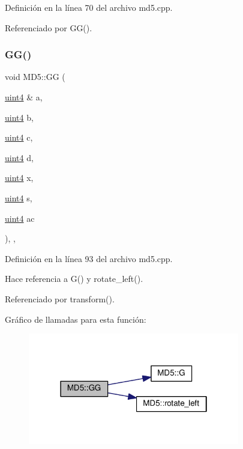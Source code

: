 Definición en la línea 70 del archivo md5.\+cpp.



Referenciado por G\+G().

\hypertarget{classMD5_a8ebdbe52608e522516d1759a31753212}{}\label{classMD5_a8ebdbe52608e522516d1759a31753212} 
\subsubsection{\texorpdfstring{G\+G()}{GG()}}
{\footnotesize\ttfamily void M\+D5\+::\+GG (\begin{DoxyParamCaption}\item[{\hyperlink{classMD5_a2e5b84a3d7db292f49873061214a0444}{uint4} \&}]{a,  }\item[{\hyperlink{classMD5_a2e5b84a3d7db292f49873061214a0444}{uint4}}]{b,  }\item[{\hyperlink{classMD5_a2e5b84a3d7db292f49873061214a0444}{uint4}}]{c,  }\item[{\hyperlink{classMD5_a2e5b84a3d7db292f49873061214a0444}{uint4}}]{d,  }\item[{\hyperlink{classMD5_a2e5b84a3d7db292f49873061214a0444}{uint4}}]{x,  }\item[{\hyperlink{classMD5_a2e5b84a3d7db292f49873061214a0444}{uint4}}]{s,  }\item[{\hyperlink{classMD5_a2e5b84a3d7db292f49873061214a0444}{uint4}}]{ac }\end{DoxyParamCaption})\hspace{0.3cm}{\ttfamily [inline]}, {\ttfamily [static]}, {\ttfamily [private]}}



Definición en la línea 93 del archivo md5.\+cpp.



Hace referencia a G() y rotate\+\_\+left().



Referenciado por transform().

Gráfico de llamadas para esta función\+:\nopagebreak
\begin{figure}[H]
\begin{center}
\leavevmode
\includegraphics[width=262pt]{classMD5_a8ebdbe52608e522516d1759a31753212_cgraph}
\end{center}
\end{figure}
\hypertarget{classMD5_a59392e8552045b37628a48497ede9cf0}{}\label{classMD5_a59392e8552045b37628a48497ede9cf0} 
